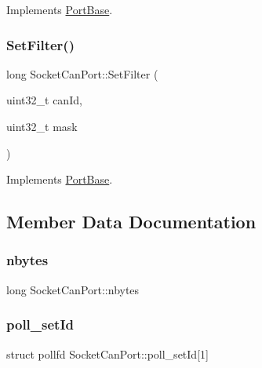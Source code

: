 Implements \hyperlink{classPortBase_a26213ebb6ea0a0b77f60c28944e3bb8e}{Port\+Base}.

\mbox{\label{classSocketCanPort_a1a5d0866524dae11ddff0d1ac22e0dd5}} 
\subsubsection{\texorpdfstring{Set\+Filter()}{SetFilter()}}
{\footnotesize\ttfamily long Socket\+Can\+Port\+::\+Set\+Filter (\begin{DoxyParamCaption}\item[{uint32\+\_\+t}]{can\+Id,  }\item[{uint32\+\_\+t}]{mask }\end{DoxyParamCaption})\hspace{0.3cm}{\ttfamily [virtual]}}



Implements \hyperlink{classPortBase_a1d857a81a8e3f3bd460ef7c802ee762c}{Port\+Base}.



\subsection{Member Data Documentation}
\mbox{\label{classSocketCanPort_a7b06b4d8c897c1a189329f20632fdb71}} 
\subsubsection{\texorpdfstring{nbytes}{nbytes}}
{\footnotesize\ttfamily long Socket\+Can\+Port\+::nbytes\hspace{0.3cm}{\ttfamily [private]}}

\mbox{\label{classSocketCanPort_ad0374fe5ea78a061e7abd16b812f44d5}} 
\subsubsection{\texorpdfstring{poll\+\_\+set\+Id}{poll\_setId}}
{\footnotesize\ttfamily struct pollfd Socket\+Can\+Port\+::poll\+\_\+set\+Id\mbox{[}1\mbox{]}\hspace{0.3cm}{\ttfamily [private]}}

